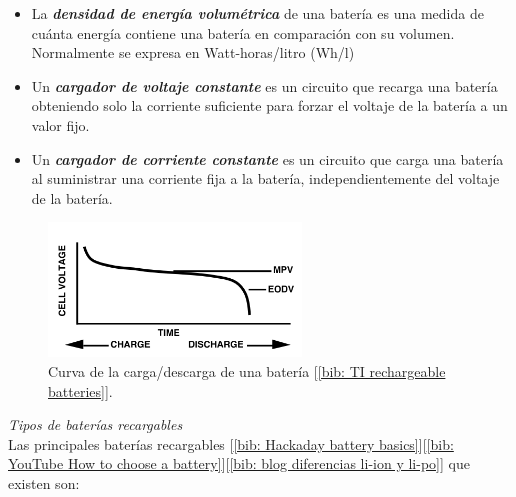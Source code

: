 \documentclass[12pt]{article}
\begin{document}
\begin{itemize}
 		\item La \textit{\textbf{densidad de energía volumétrica}} de una batería es una medida de cuánta energía contiene una batería en comparación con su volumen. Normalmente se expresa en Watt-horas/litro (Wh/l)
 		\item Un \textit{\textbf{cargador de voltaje constante}} es un circuito que recarga una batería obteniendo solo la corriente suficiente para forzar el voltaje de la batería a un valor fijo.
 		\item Un \textit{\textbf{cargador de corriente constante}} es un circuito que carga una batería al suministrar una corriente fija a la batería, independientemente del voltaje de la batería.
	\end{itemize}

	\pagebreak
	
	\begin{figure}[h]
		\begin{center}
			\includegraphics[width=0.6\textwidth]{img/chargeDischargeCurve_TxInst.png}
			\caption{Curva de la carga/descarga de una batería [\ref{bib: TI rechargeable batteries}].}
		\end{center}
	\end{figure}


	
	\noindent \textit{Tipos de baterías recargables}\\
	
	\noindent Las principales baterías recargables [\ref{bib: Hackaday battery basics}][\ref{bib: YouTube How to choose  a battery}][\ref{bib: blog diferencias li-ion y li-po}] que existen son: \\
	
\end{document}
